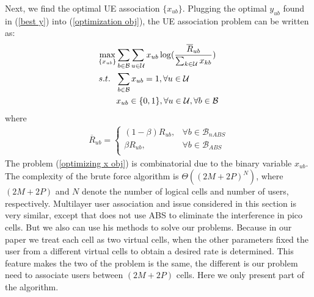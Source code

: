 \documentclass[journal]{IEEETran}
\begin{document}
Next, we find the optimal UE association $\{x_{ub}\}$. Plugging the optimal $y_{ub}$ found in (\ref{best y}) into (\ref{optimization obj}), the UE association problem can be written as:
\begin{align}\label{optimizing x obj}
  \max_{\{x_{ub}\}} &\sum_{b \in \mathcal{B}} \sum_{u \in \mathcal{U}} x_{ub} \log(\frac{\overline{R}_{ub}}{ \sum_{k \in \mathcal{U}} x_{kb}}) \\
  s.t.~~&\sum_{b \in \mathcal{B}} x_{ub} = 1,\forall u \in \mathcal{U} \notag\\
  &x_{ub} \in \{ 0,1 \},\forall u \in \mathcal{U}, \forall b \in \mathcal{B} \notag
\end{align}
where
\begin{align*}
\overline{R}_{ub} = \left\{
  \begin{matrix}
    (1-\beta)R_{ub},&\forall b \in \mathcal{B}_{nABS} \\
    \beta R_{ub},&\forall b \in \mathcal{B}_{ABS} \\
  \end{matrix}
  \right.
\end{align*}
The problem (\ref{optimizing x obj}) is combinatorial due to the binary variable $x_{ub}$. The complexity of the brute force algorithm is $\Theta((2M + 2P)^N)$, where $(2M + 2P)$ and $N$ denote the number of logical cells and number of users, respectively. Multilayer user association \cite{UserAssociation} and issue considered in this section is very similar, except that \cite{UserAssociation} does not use ABS to eliminate the interference in pico cells. But we also can use his methods to solve our problems. Because in our paper we treat each cell as two virtual cells, when the other parameters fixed the user from a different virtual cells to obtain a desired rate is determined. This feature makes the two of the problem is the same, the different is our problem need to associate users between $(2M + 2P)$ cells. Here we only present part of the algorithm.
\end{document}
